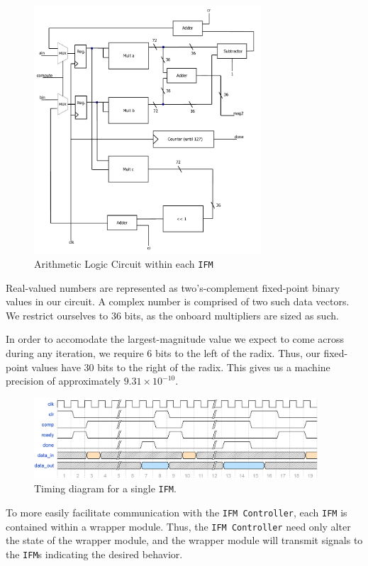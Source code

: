 \documentclass{article}
\begin{document}
\begin{figure}[H]
  \centering
    \includegraphics[width=240pt]{block_diagrams/ifm.pdf}
  \caption{Arithmetic Logic Circuit within each \texttt{IFM}}
\end{figure}

Real-valued numbers are represented as two's-complement fixed-point binary
values in our circuit. A complex number is comprised of two such data vectors. 
We restrict ourselves to 36 bits, as the onboard multipliers
are sized as such. 

In order to accomodate the largest-magnitude value we
expect to come across during any iteration, we require 6 bits to the
left of the radix. Thus, our fixed-point values have 30 bits to the
right of the radix. This gives us a machine precision of approximately
$9.31 \times 10 ^ {-10}$.

\begin{figure}[H]
  \centering
    \includegraphics[width=300pt]{timing_diagrams/IFM.PNG}
  \caption{Timing diagram for a single \texttt{IFM}.}
\end{figure}


To more easily facilitate communication with the \texttt{IFM Controller}, each \texttt{IFM} is contained within a wrapper module.
Thus, the \texttt{IFM Controller} need only alter the state of the wrapper module, and the wrapper module will transmit signals to the \texttt{IFM}s indicating the desired behavior.
\end{document}
